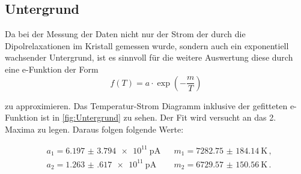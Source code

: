 \subsection{Untergrund}

Da bei der Messung der Daten nicht nur der Strom der durch die Dipolrelaxationen im Kristall gemessen wurde, sondern auch ein exponentiell wachsender Untergrund, ist es sinnvoll
für die weitere Auswertung diese durch eine e-Funktion der Form 
\begin{equation*}
  f(T) = a \cdot \exp(-\frac{m}{T})
\end{equation*}

\noindent 
zu approximieren. Das Temperatur-Strom Diagramm inklusive der gefitteten e-Funktion ist in \autoref{fig:Untergrund} zu sehen. Der Fit wird versucht an das 2. Maxima zu legen. 
Daraus folgen folgende Werte:

\begin{align*}
  &a_1 =  \SI{6.197(3794)e11}{\pico\ampere} &&  m_1 = \SI{7282.75(18414)}{\kelvin} \, ,\\
  &a_2 = \SI{1.263(617)e11}{\pico\ampere} &&  m_2 = \SI{6729.57(15056)}{\kelvin} \, .\\ 
\end{align*}


